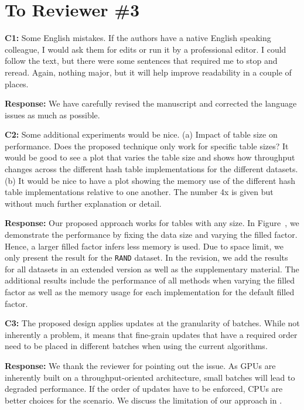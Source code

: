 \section*{To Reviewer \#3}

\begin{shaded}
	\noindent\textbf{C1:} Some English mistakes.  If the authors have a native English speaking colleague, I would ask them for edits or run it by a professional editor.  I could follow the text, but there were some sentences that required me to stop and reread.  Again, nothing major, but it will help improve readability in a couple of places.
\end{shaded}
%
\noindent\textbf{Response:} 
We have carefully revised the manuscript and corrected the language issues as much as possible. 

\begin{shaded}
	\noindent\textbf{C2:} Some additional experiments would be nice.
	(a) Impact of table size on performance.  Does the proposed technique only work for specific table sizes?  It would be good to see a plot that varies the table size and shows how throughput changes across the different hash table implementations for the different datasets.
	(b) It would be nice to have a plot showing the memory use of the different hash table implementations relative to one another.  The number 4x is given but without much further explanation or detail.
\end{shaded}
%
\noindent\textbf{Response:} 
Our proposed approach works for tables with any size. In Figure~, we demonstrate the performance by fixing the data size and varying the filled factor. Hence, a larger filled factor infers less memory is used. Due to space limit, we only present the result for the {\tt RAND} dataset.
In the revision, we add the results for all datasets in an extended version as well as the supplementary material. The additional results include the performance of all methods when varying the filled factor as well as the memory usage for each implementation for the default filled factor. 

\begin{shaded}
	\noindent\textbf{C3:} The proposed design applies updates at the granularity of batches.  While not inherently a problem, it means that fine-grain updates that have a required order need to be placed in different batches when using the current algorithms.
\end{shaded}
%
\noindent\textbf{Response:} 
We thank the reviewer for pointing out the issue. As GPUs are inherently built on a throughput-oriented architecture, small batches will lead to degraded performance. 
If the order of updates have to be enforced, CPUs are better choices for the scenario. 
We discuss the limitation of our approach in .

